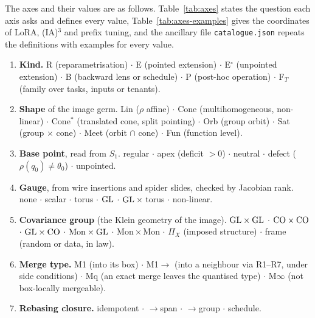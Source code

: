 The axes and their values are as follows. Table~\ref{tab:axes} states the question each axis asks and defines every
value, Table~\ref{tab:axes-examples} gives the coordinates of LoRA, (IA)$^3$ and prefix tuning, and the ancillary file
\texttt{catalogue.json} repeats the definitions with examples for every value.
\begin{enumerate}[label=\arabic*.]
  \item \textbf{Kind.} R (reparametrisation) $\cdot$ E (pointed extension) $\cdot$ E$^\circ$ (unpointed extension)
  $\cdot$ B (backward lens or schedule) $\cdot$ P (post-hoc operation) $\cdot$ F$_T$ (family over tasks, inputs or
  tenants).
  \item \textbf{Shape} of the image germ. Lin ($\rho$ affine) $\cdot$ Cone (multihomogeneous, non-linear) $\cdot$
  Cone$^*$ (translated cone, split pointing) $\cdot$ Orb (group orbit) $\cdot$ Sat (group $\times$ cone) $\cdot$ Meet
  (orbit $\cap$ cone) $\cdot$ Fun (function level).
  \item \textbf{Base point}, read from $S_1$. regular $\cdot$ apex (deficit $>0$) $\cdot$ neutral $\cdot$ defect
  ($\rho(q_0)\neq\theta_0$) $\cdot$ unpointed.
  \item \textbf{Gauge}, from wire insertions and spider slides, checked by Jacobian rank. none $\cdot$ scalar $\cdot$
  torus $\cdot$ $\mathrm{GL}$ $\cdot$ $\mathrm{GL}\times{}$torus $\cdot$ non-linear.
  \item \textbf{Covariance group} (the Klein geometry of the image). $\mathrm{GL}\times\mathrm{GL}$ $\cdot$ $\mathrm{CO}\times\mathrm{CO}$ $\cdot$
  $\mathrm{GL}\times\mathrm{CO}$ $\cdot$ $\mathrm{Mon}\times\mathrm{GL}$ $\cdot$ $\mathrm{Mon}\times\mathrm{Mon}$ $\cdot$ $\Pi_X$ (imposed
  structure) $\cdot$ frame (random or data, in law).
  \item \textbf{Merge type.} M1 (into its box) $\cdot$ M1$\to$ (into a neighbour via R1--R7, under side conditions)
  $\cdot$ Mq (an exact merge leaves the quantised type) $\cdot$ M$\infty$ (not box-locally mergeable).
  \item \textbf{Rebasing closure.} idempotent $\cdot$ $\to$span $\cdot$ $\to$group $\cdot$ schedule.
\end{enumerate}

